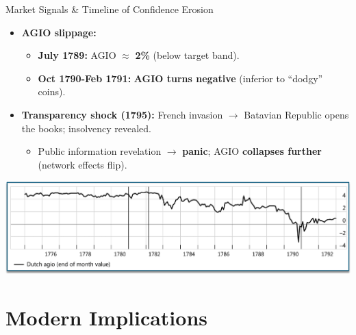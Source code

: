 \documentclass[aspectratio=169, xcolor=table]{beamer}
\begin{document}
\begin{frame}{Market Signals \& Timeline of Confidence Erosion}
  \begin{itemize}
    \item \textbf{AGIO slippage:}
          \begin{itemize}
            \item \textbf{July 1789:} AGIO $\approx$ \textbf{2\%} (below target band).
            \item \textbf{Oct 1790-Feb 1791:} \textbf{AGIO turns negative} (inferior to ``dodgy'' coins).
          \end{itemize}
    \item \textbf{Transparency shock (1795):} French invasion $\rightarrow$ Batavian Republic opens the books; insolvency revealed.
          \begin{itemize}
            \item Public information revelation $\rightarrow$ \textbf{panic}; AGIO \textbf{collapses further} (network effects flip).
          \end{itemize}
  \end{itemize}
  \begin{center}
    \includegraphics[width=0.8\linewidth]{pasted-images/agio_over_time.png}
  \end{center}
\end{frame}


\section{Modern Implications}
\end{document}
